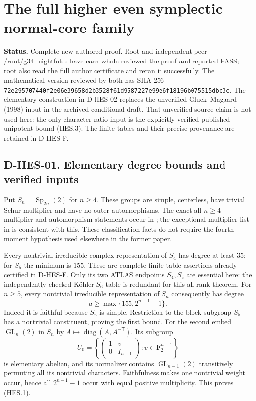 \section{The full higher even symplectic normal-core family}
\label{sec:higher-even-symplectic}

\noindent\textbf{Status.} Complete new authored proof. Root and independent peer
/root/g34\_eightfolds have each whole-reviewed the proof and reported
PASS; root also read the full author certificate and reran it successfully.
The mathematical version reviewed by both has SHA-256
\texttt{72e295707440f2e06e39658d2b3528f61d9587227e99e6f18196b075515dbc3c}. The elementary construction in D-HES-02
replaces the unverified Gluck--Magaard (1998) input in the archived
conditional draft. That unverified source claim is not used here:
the only character-ratio input is the explicitly verified published
unipotent bound (HES.3). The finite tables and their precise provenance
are retained in D-HES-F.

\subsection*{D-HES-01. Elementary degree bounds and verified inputs}

Put $S_n=\operatorname{Sp}_{2n}(2)$ for $n\ge4$. These groups are simple,
centerless, have trivial Schur multiplier and have no outer automorphisms.
The exact all-$n\ge4$ multiplier and automorphism statements occur in
\cite[author p.~25]{HES:GM2006}; the exceptional-multiplier list in
\cite[Chapter~5, Table~1, numbered p.~35]{BI:HHM} is consistent with this.
These classification facts do not require the fourth-moment hypothesis
used elsewhere in the former paper.

Every nontrivial irreducible complex representation of $S_4$ has degree
at least $35$; for $S_5$ the minimum is $155$. These are complete finite
table assertions already certified in D-HES-F. Only its two ATLAS
endpoints $S_4,S_5$ are essential here: the independently checked
K\"ohler $S_6$ table is redundant for this all-rank theorem.
For $n\ge5$, every
nontrivial irreducible representation of $S_n$ consequently has degree
\[
                     a\ge\max\{155,2^{n-1}-1\}.
\tag{HES.1}
\]
Indeed it is faithful because $S_n$ is simple. Restriction to the block
subgroup $S_5$ has a nontrivial constituent, proving the first bound.
For the second embed $\operatorname{GL}_n(2)$ in $S_n$ by
$A\mapsto\operatorname{diag}(A,A^{-\mathsf T})$. Its subgroup
\[
 U_0=\left\{\begin{pmatrix}1&v\\0&I_{n-1}\end{pmatrix}:
                                  v\in\mathbf F_2^{n-1}\right\}
\]
is elementary abelian, and its normalizer contains
$\operatorname{GL}_{n-1}(2)$ transitively permuting all its nontrivial
characters. Faithfulness makes one nontrivial weight occur, hence all
$2^{n-1}-1$ occur with equal positive multiplicity. This proves (HES.1).

